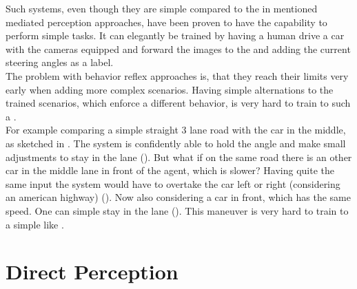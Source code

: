 Such systems, even though they are simple compared to the in  mentioned mediated perception approaches, have been proven to have the capability to perform simple tasks. It can elegantly be trained by having a human drive a car with the cameras equipped and forward the images to the \nn and adding the current steering angles as a label.\cite{chen2015deepdriving}\\

The problem with behavior reflex approaches is, that they reach their limits very early when adding more complex scenarios. Having simple alternations to the trained scenarios, which enforce a different behavior, is very hard to train to such a \nn.\\
For example comparing a simple straight 3 lane road with the car in the middle, as sketched in . The system is confidently able to hold the angle and make small adjustments to stay in the lane (). But what if on the same road there is an other car in the middle lane in front of the agent, which is slower? Having quite the same input the system would have to overtake the car left or right (considering an american highway) (). Now also considering a car in front, which has the same speed. One can simple stay in the lane (). This maneuver is very hard to train to a simple \nn like \alvinn.





\section{Direct Perception}\label{sec: Direct Perception}


